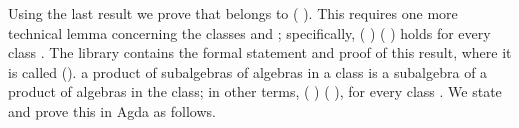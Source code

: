 \begin{code}%
\>[0]\<%
\\
\>[0][@{}l@{\AgdaIndent{1}}]%
\>[1]\AgdaSpace{}%
\AgdaSymbol{:}\AgdaSpace{}%
\AgdaSpace{}%
\AgdaOperator{\AgdaFunction{𝔽[}}\AgdaSpace{}%
\AgdaSpace{}%
\AgdaOperator{\AgdaFunction{]}}\AgdaSpace{}%
\<%
\\
%
\>[1]\AgdaSpace{}%
\AgdaSymbol{=}\AgdaSpace{}%
\AgdaSpace{}%
\AgdaSpace{}%
\AgdaSpace{}%
\AgdaOperator{\AgdaInductiveConstructor{,}}\AgdaSpace{}%
\<%
\\
\>[1][@{}l@{\AgdaIndent{0}}]%
\>[2]\<%
\\
%
\>[2]\AgdaSpace{}%
\AgdaSymbol{:}\AgdaSpace{}%
\AgdaSpace{}%
\AgdaOperator{\AgdaFunction{𝔽[}}\AgdaSpace{}%
\AgdaSpace{}%
\AgdaOperator{\AgdaFunction{]}}\AgdaSpace{}%
\AgdaSpace{}%
\AgdaSpace{}%
\AgdaSpace{}%
\<%
\\
%
\>[2]\AgdaSpace{}%
\AgdaSpace{}%
\AgdaSymbol{=}\AgdaSpace{}%
\AgdaSpace{}%
\AgdaSpace{}%
\<%
\\
%
\>[2]\AgdaSpace{}%
\AgdaSpace{}%
\AgdaSymbol{\{}\AgdaSymbol{\}\{}\AgdaSymbol{\}}\AgdaSpace{}%
\AgdaSpace{}%
\AgdaSymbol{=}\AgdaSpace{}%
\AgdaSpace{}%
\<%
\\
%
\\[\AgdaEmptyExtraSkip]%
%
\>[1]\AgdaSpace{}%
\AgdaSymbol{:}\AgdaSpace{}%
\AgdaOperator{\AgdaFunction{𝔽[}}\AgdaSpace{}%
\AgdaSpace{}%
\AgdaOperator{\AgdaFunction{]}}\AgdaSpace{}%
\AgdaSpace{}%
\<%
\\
%
\>[1]\AgdaSpace{}%
\AgdaSymbol{=}\AgdaSpace{}%
\AgdaSpace{}%
\<%
\\
\>[0]\<%
\end{code}
Using the last result we prove that  belongs to  ( ). This
requires one more technical lemma concerning the classes  and ; specifically,
\ifshort
{} ( )   ( ) holds for every class .
The \agdaalgebras library contains the formal statement and proof of this result, where
it is called  (\seeshort).
\else
a product of subalgebras of algebras in a class is a subalgebra of a product of algebras in the class;
in other terms,  ( )   ( ), for every class .
We state and prove this in Agda as follows.

